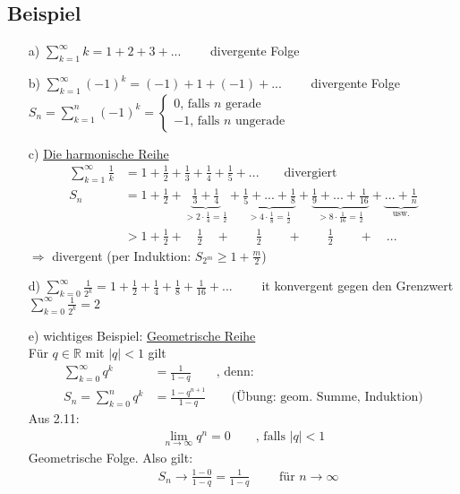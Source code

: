 \documentclass[12pt, titlepage]{article}
\newcommand{\R}{\mathds{R}}
\newcommand{\infn}{n\rightarrow\infty}
\renewcommand{\>}{\rightarrow}
\renewcommand{\*}{\cdot}
\begin{document}
	\subsection{Beispiel}
	\begin{itemize}
		\item[a)] $\sum_{k=1}^{\infty}k=1+2+3+...\qquad$ divergente Folge
		\item[b)] $\sum_{k=1}^{\infty}(-1)^k=(-1)+1+(-1)+...\qquad$ divergente Folge\\
		$S_n=\sum_{k=1}^{n}(-1)^k=\begin{cases}
		0\textrm{, falls }n\textrm{ gerade}\\
		-1\textrm{, falls }n\textrm{ ungerade}
		\end{cases}$
		\item[c)] \underline{Die harmonische Reihe}
		\begin{align*}
			\sum_{k=1}^{\infty}\frac{1}{k}&=1+\frac{1}{2}+\frac{1}{3}+\frac{1}{4}+\frac{1}{5}+...\qquad\textrm{divergiert}\\
			S_n&=1+\frac{1}{2}+\underbrace{\frac{1}{3}+\frac{1}{4}}_{>2\*\frac{1}{4}=\frac{1}{2}}+\underbrace{\frac{1}{5}+...+\frac{1}{8}}_{>4\*\frac{1}{8}=\frac{1}{2}}+\underbrace{\frac{1}{9}+...+\frac{1}{16}}_{>8\*\frac{1}{16}=\frac{1}{2}}+\underbrace{...+\frac{1}{n}}_{\textrm{usw.}}\\
			&>1+\frac{1}{2}+\quad\frac{1}{2}\quad+\qquad\frac{1}{2}\qquad+\qquad\frac{1}{2}\qquad+\quad...
		\end{align*}
		$\Rightarrow$ divergent (per Induktion: $S_{2^m}\geq1+\frac{m}{2}$)
		\item[d)] $\sum_{k=0}^{\infty}\frac{1}{2^k}=1+\frac{1}{2}+\frac{1}{4}+\frac{1}{8}+\frac{1}{16}+...\qquad$ it konvergent gegen den Grenzwert $\sum_{k=0}^{\infty}\frac{1}{2^k}=2$
		\item[e)] wichtiges Beispiel: \underline{Geometrische Reihe}\\
		Für $q\in\R$ mit $|q|<1$ gilt
		\begin{align*}
			\sum_{k=0}^{\infty}q^k&=\frac{1}{1-q}\qquad\textrm{, denn:}\\
			S_n=\sum_{k=0}^{n}q^k&=\frac{1-q^{n+1}}{1-q}\qquad\textrm{(Übung: geom. Summe, Induktion)}
		\end{align*}
		Aus 2.11:
		\begin{align*}
			\lim\limits_{\infn}q^n=0\qquad\textrm{, falls }|q|<1
		\end{align*}
		Geometrische Folge. Also gilt:
		\begin{align*}
			&S_n\>\frac{1-0}{1-q}=\frac{1}{1-q}\qquad\textrm{ für }\infn\\

\end{align*}
\end{itemize}
\end{document}
